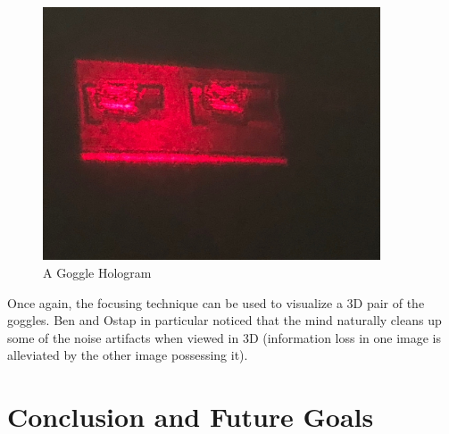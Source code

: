 \documentclass[12pt]{article}
\begin{document}
\begin{figure}
    \centering
    \includegraphics[width=100mm]{final_hologram.jpg}
    \caption{A Goggle Hologram}
    \label{fig:goggle_holo}
\end{figure}

Once again, the focusing technique can be used to visualize a 3D pair of the goggles. Ben and Ostap in particular noticed that the mind naturally cleans up some of the noise artifacts when viewed in 3D (information loss in one image is alleviated by the other image possessing it).

\newpage
\section{Conclusion and Future Goals}




\end{document}
